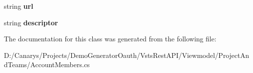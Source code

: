 \begin{DoxyCompactItemize}
\item 
\mbox{\label{class_vsts_rest_a_p_i_1_1_viewmodel_1_1_project_and_teams_1_1_account_members_1_1_member_a679643cbd1becf678381e2510633b01f}} 
string {\bfseries url}
\item 
\mbox{\label{class_vsts_rest_a_p_i_1_1_viewmodel_1_1_project_and_teams_1_1_account_members_1_1_member_a420d2c653ba15c9f7b9f97e7a42b10de}} 
string {\bfseries descriptor}
\end{DoxyCompactItemize}


The documentation for this class was generated from the following file\+:\begin{DoxyCompactItemize}
\item 
D\+:/\+Canarys/\+Projects/\+Demo\+Generator\+Oauth/\+Vsts\+Rest\+A\+P\+I/\+Viewmodel/\+Project\+And\+Teams/Account\+Members.\+cs\end{DoxyCompactItemize}
